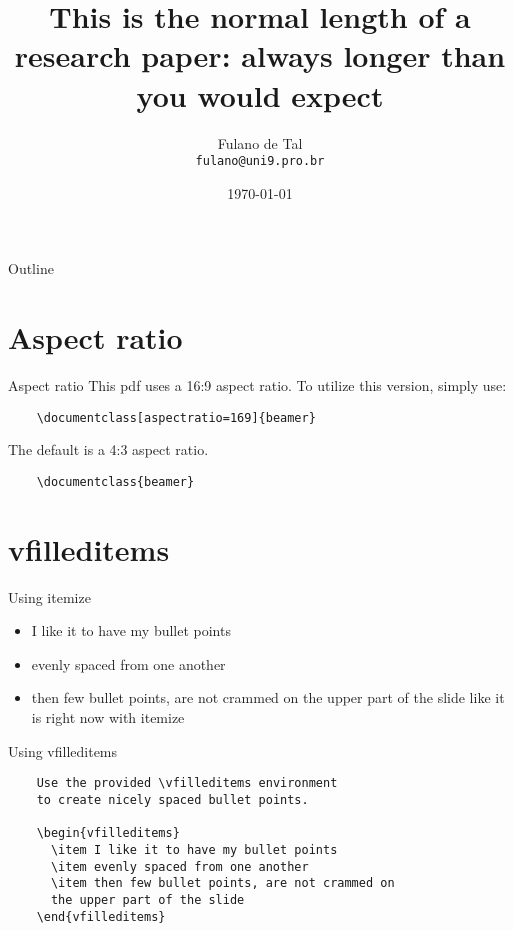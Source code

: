 \documentclass[aspectratio=169]{beamer}                    %
\title[short title]{This is the normal length of a research paper:
	always longer than you would expect}
\author{Fulano de Tal \\
	\texttt{fulano@uni9.pro.br}}
\institute{Universidade Nove de Julho - UNINOVE}
\date{\today}
\begin{document}
\maketitle

\begin{frame}{Outline}
	\tableofcontents
\end{frame}

\section{Aspect ratio}
\begin{frame}[fragile]{Aspect ratio}
	This pdf uses a 16:9 aspect ratio. To utilize
	this version, simply use:
	\begin{verbatim}
    \documentclass[aspectratio=169]{beamer}
    \end{verbatim}
	\vfill
	The default is a 4:3 aspect ratio.
	\begin{verbatim}
    \documentclass{beamer}
  \end{verbatim}
\end{frame}

\section{vfilleditems}
\begin{frame}{Using itemize}
	\begin{itemize}
		\item I like it to have my bullet points
		\item evenly spaced from one another
		\item then few bullet points, are not crammed on
		      the upper part of the slide
		      like it is right now with itemize
	\end{itemize}
\end{frame}

\begin{frame}[fragile]{Using vfilleditems}
	\begin{verbatim}
    Use the provided \vfilleditems environment
    to create nicely spaced bullet points.

    \begin{vfilleditems}
      \item I like it to have my bullet points
      \item evenly spaced from one another
      \item then few bullet points, are not crammed on
      the upper part of the slide
    \end{vfilleditems}
    \end{verbatim}
\end{frame}
\end{document}
